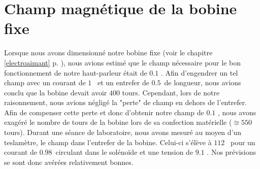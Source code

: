 \section{Champ magnétique de la bobine fixe}
\label{mesures champ}
Lorsque nous avons dimensionné notre bobine fixe (voir le chapitre \ref{electroaimant} p. \pageref{electroaimant}), nous avions estimé que le champ nécessaire pour le bon fonctionnement de notre haut-parleur était de $0.1$ \tesla.  Afin d'engendrer un tel champ avec un courant de $1$ \ampere \, et un entrefer de $0.5$ \centi\meter \,de longueur, nous avions conclu que la bobine devait avoir $400$ tours. Cependant, lors de notre raisonnement, nous avions négligé la "perte" de champ en dehors de l'entrefer. Afin de compenser cette perte et donc d'obtenir notre champ de $0.1$ \tesla, nous avons exagéré le nombre de tours de la bobine lors de sa confection matérielle ($\cong 550$ tours). 
Durant une séance de laboratoire, nous avons mesuré au moyen d'un teslamètre, le champ dans l'entrefer de la bobine. Celui-ci s'élève à $112$ \milli \tesla \, pour un courant de $0.98$ \ampere \,circulant dans le solénoïde et une tension de $9.1$ \volt. Nos prévisions se sont donc avérées relativement bonnes.